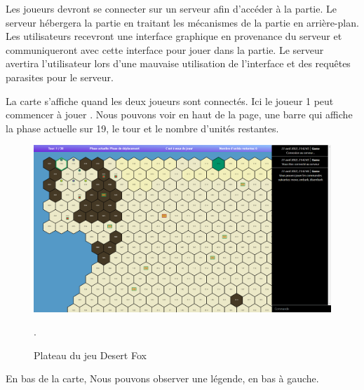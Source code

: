 Les joueurs devront se connecter sur un serveur afin d'accéder à la partie. Le serveur hébergera la partie en traitant les mécanismes de la partie en arrière-plan. Les utilisateurs recevront une interface graphique en provenance du serveur et communiqueront avec cette interface pour jouer dans la partie.
Le serveur avertira l'utilisateur lors d'une mauvaise utilisation de l'interface et des requêtes parasites pour le serveur.




La carte s'affiche quand les deux joueurs sont connectés. Ici le joueur 1 peut commencer à jouer
. Nous pouvons voir en haut de la page, une barre qui affiche la phase actuelle sur 19, le tour  et le nombre d'unités restantes.

\begin{figure}[H]
    \centering
    \includegraphics[scale=0.35]{data/plateau_du_jeu.png}
    \caption{Plateau du jeu Desert Fox}.
\end{figure}

En bas de la carte, Nous pouvons observer une légende, en bas à gauche.\\

